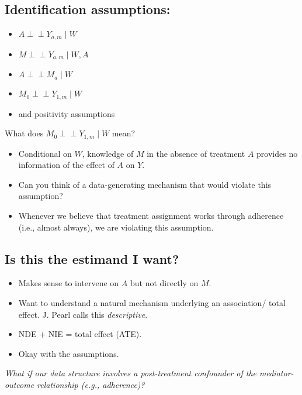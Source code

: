 \documentclass[
  12pt,
]{book}
\providecommand{\tightlist}{%
  \setlength{\itemsep}{0pt}\setlength{\parskip}{0pt}}
\theoremstyle{definition}
\theoremstyle{definition}
\theoremstyle{definition}
\newcommand{\indep}{\mbox{$\perp\!\!\!\perp$}}
\newcommand{\1}{\mathbbm{1}}
\begin{document}
\hypertarget{identification-assumptions-1}{%
\subsection{Identification assumptions:}\label{identification-assumptions-1}}

\begin{itemize}
\tightlist
\item
  \(A \indep Y_{a,m} \mid W\)
\item
  \(M \indep Y_{a,m} \mid W, A\)
\item
  \(A \indep M_a \mid W\)
\item
  \(M_0 \indep Y_{1,m} \mid W\)
\item
  and positivity assumptions
\end{itemize}

What does \(M_0 \indep Y_{1,m} \mid W\) mean?

\begin{itemize}
\tightlist
\item
  Conditional on \(W\), knowledge of \(M\) in the absence of treatment \(A\)
  provides no information of the effect of \(A\) on \(Y\).
\item
  Can you think of a data-generating mechanism that would violate this
  assumption?
\item
  Whenever we believe that treatment assignment works through adherence (i.e., almost
  always), we are violating this assumption.
\end{itemize}

\hypertarget{is-this-the-estimand-i-want-1}{%
\subsection{Is this the estimand I want?}\label{is-this-the-estimand-i-want-1}}

\begin{itemize}
\tightlist
\item
  Makes sense to intervene on \(A\) but not directly on \(M\).
\item
  Want to understand a natural mechanism underlying an association/ total
  effect. J. Pearl calls this \emph{descriptive}.
\item
  NDE + NIE = total effect (ATE).
\item
  Okay with the assumptions.
\end{itemize}

\emph{What if our data structure involves a post-treatment confounder of the
mediator-outcome relationship (e.g., adherence)?}
\end{document}
